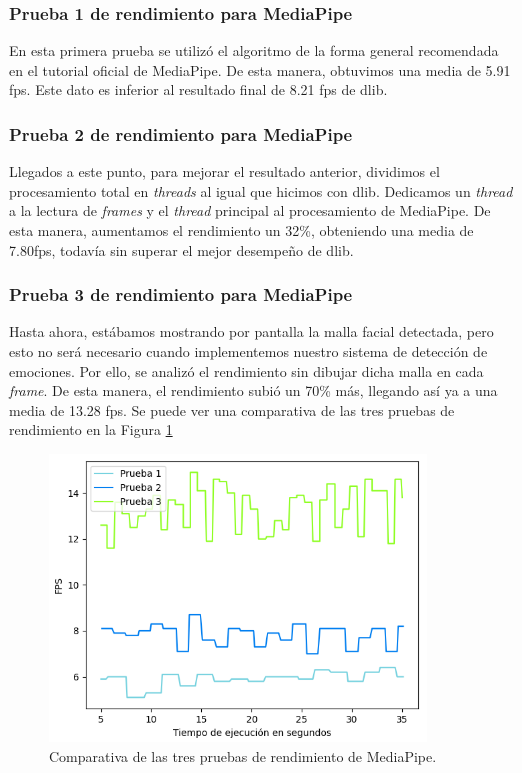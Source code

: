 \subsubsection{Prueba 1 de rendimiento para MediaPipe}
En esta primera prueba se utilizó el algoritmo de la forma general recomendada en el tutorial oficial de MediaPipe. De esta manera, obtuvimos una media de 5.91 fps. Este dato es inferior al resultado final de 8.21 fps de dlib.

\subsubsection{Prueba 2 de rendimiento para MediaPipe}
Llegados a este punto, para mejorar el resultado anterior, dividimos el procesamiento total en \textit{threads} al igual que hicimos con dlib. Dedicamos un \textit{thread} a la lectura de \textit{frames} y el \textit{thread} principal al procesamiento de MediaPipe. De esta manera, aumentamos el rendimiento un 32\%, obteniendo una media de 7.80fps, todavía sin superar el mejor desempeño de dlib.

\subsubsection{Prueba 3 de rendimiento para MediaPipe}
Hasta ahora, estábamos mostrando por pantalla la malla facial detectada, pero esto no será necesario cuando implementemos nuestro sistema de detección de emociones. Por ello, se analizó el rendimiento sin dibujar dicha malla en cada \textit{frame}. De esta manera, el rendimiento subió un 70\% más, llegando así ya a una media de 13.28 fps. Se puede ver una comparativa de las tres pruebas de rendimiento en la Figura \ref{fig:mediapipe_rendimiento}

\begin{figure} [h!]
  \begin{center}
    \includegraphics[width=10cm]{figs/mediapipe_rendimiento.png}
  \end{center}
  \captionsetup{justification=centering}
  \caption{Comparativa de las tres pruebas de rendimiento de MediaPipe.}
  \label{fig:mediapipe_rendimiento}
\end{figure}

